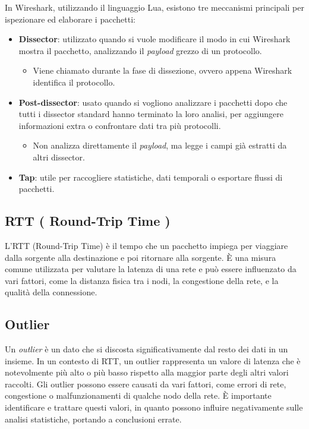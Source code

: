 In Wireshark, utilizzando il linguaggio Lua, esistono tre meccanismi principali per ispezionare ed elaborare i pacchetti:

\begin{itemize}
  \item \textbf{Dissector}: utilizzato quando si vuole modificare il modo in cui Wireshark mostra il pacchetto, analizzando il \textit{payload} grezzo di un protocollo.
  \begin{itemize}
    \item Viene chiamato durante la fase di dissezione, ovvero appena Wireshark identifica il protocollo.
  \end{itemize}

  \item \textbf{Post-dissector}: usato quando si vogliono analizzare i pacchetti dopo che tutti i dissector standard hanno terminato la loro analisi, per aggiungere informazioni extra o confrontare dati tra più protocolli.
  \begin{itemize}
    \item Non analizza direttamente il \textit{payload}, ma legge i campi già estratti da altri dissector.
  \end{itemize}

  \item \textbf{Tap}: utile per raccogliere statistiche, dati temporali o esportare flussi di pacchetti.
\end{itemize}

\subsection{RTT ( Round-Trip Time )}

L'RTT (Round-Trip Time) è il tempo che un pacchetto impiega per viaggiare dalla sorgente alla destinazione e poi ritornare alla sorgente. È una misura comune utilizzata per valutare la latenza di una rete e può essere influenzato da vari fattori, come la distanza fisica tra i nodi, la congestione della rete, e la qualità della connessione.

\subsection{Outlier}

Un \textit{outlier} è un dato che si discosta significativamente dal resto dei dati in un insieme. In un contesto di RTT, un outlier rappresenta un valore di latenza che è notevolmente più alto o più basso rispetto alla maggior parte degli altri valori raccolti. Gli outlier possono essere causati da vari fattori, come errori di rete, congestione o malfunzionamenti di qualche nodo della rete. È importante identificare e trattare questi valori, in quanto possono influire negativamente sulle analisi statistiche, portando a conclusioni errate.

